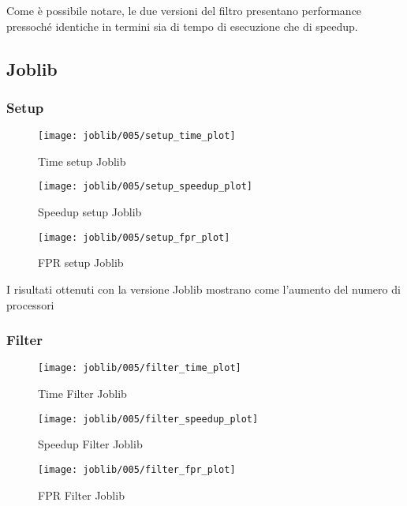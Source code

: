 Come è possibile notare, le due versioni del filtro presentano performance pressoché identiche in termini sia di tempo
di esecuzione che di speedup.

\subsection{Joblib}\label{subsec:joblib-test}
\subsubsection{Setup}\label{subsubsec:joblib-setup}
\begin{figure}[H]
    \centering
    \texttt{[image: joblib/005/setup\_time\_plot]}
        \caption{Time setup Joblib}\label{fig:005-setup_time_joblib}
    \endminipage\hfill
    \texttt{[image: joblib/005/setup\_speedup\_plot]}
        \caption{Speedup setup Joblib}\label{fig:005-setup_speedup_joblib}
    \endminipage\hfill
\end{figure}
\begin{figure}[H]
    \centering
    \texttt{[image: joblib/005/setup\_fpr\_plot]}
        \caption{FPR setup Joblib}\label{fig:005-setup_fpr_joblib}
    \endminipage\hfill
\end{figure}

I risultati ottenuti con la versione Joblib mostrano come l'aumento del numero di processori

\subsubsection{Filter}\label{subsubsec:joblib-filter}
\begin{figure}
    \centering
    \texttt{[image: joblib/005/filter\_time\_plot]}
        \caption{Time Filter Joblib}\label{fig:005-filter_time_joblib}
    \endminipage\hfill
    \texttt{[image: joblib/005/filter\_speedup\_plot]}
        \caption{Speedup Filter Joblib}\label{fig:005-filter_speedup_joblib}
    \endminipage\hfill
\end{figure}
\begin{figure}[H]
    \centering
    \texttt{[image: joblib/005/filter\_fpr\_plot]}
        \caption{FPR Filter Joblib}\label{fig:005-filter_fpr_joblib}
    \endminipage\hfill
\end{figure}

